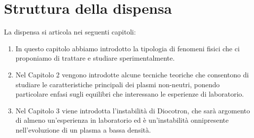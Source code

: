 \section{Struttura della dispensa}

La dispensa si articola nei seguenti capitoli:
\begin{enumerate}
    \item In questo capitolo abbiamo introdotto la tipologia di fenomeni fisici che ci proponiamo di trattare
    e studiare sperimentalmente.
    \item Nel Capitolo 2 vengono introdotte alcune tecniche teoriche che consentono di studiare le caratteristiche principali
    dei plasmi non-neutri, ponendo particolare enfasi sugli equilibri che interessano le esperienze di laboratorio.
    \item Nel Capitolo 3 viene introdotta l'instabilità di Diocotron, che sarà argomento di almeno un'esperienza in laboratorio 
    ed è un'instabilità onnipresente nell'evoluzione di un plasma a bassa densità.
  \end{enumerate}
